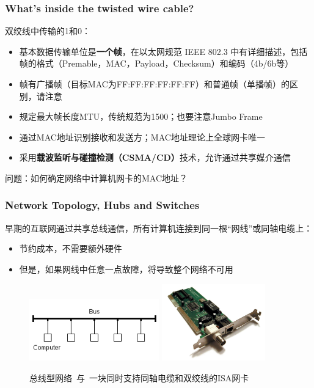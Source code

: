 \documentclass[11pt]{beamer}
\begin{document}
\begin{frame}
\frametitle{What's inside the twisted wire cable?}
双绞线中传输的1和0：
\begin{itemize}
\item 基本数据传输单位是\textbf{一个帧}，在以太网规范 IEEE 802.3 中有详细描述，包括帧的格式（Premable，MAC，Payload，Checksum）和编码（4b/6b等）
\item 帧有广播帧（目标MAC为FF:FF:FF:FF:FF:FF）和普通帧（单播帧）的区别，请注意
\item 规定最大帧长度MTU，传统规范为1500；也要注意Jumbo Frame
\item 通过MAC地址识别接收和发送方；MAC地址理论上全球网卡唯一
\item 采用\textbf{载波监听与碰撞检测（CSMA/CD）}技术，允许通过共享媒介通信
\end{itemize}
\centering 问题：如何确定网络中计算机网卡的MAC地址？
\end{frame}

\begin{frame}
\frametitle{Network Topology, Hubs and Switches}
早期的互联网通过共享总线通信，所有计算机连接到同一根“网线”或同轴电缆上：
\begin{itemize}
\item 节约成本，不需要额外硬件
\item 但是，如果网线中任意一点故障，将导致整个网络不可用
\end{itemize}
\begin{figure}
\includegraphics[width=0.5\textwidth]{Bustopologie.png}
\includegraphics[width=0.4\textwidth]{1024px-Network_card.jpg}
\caption{总线型网络\ 与\ 一块同时支持同轴电缆和双绞线的ISA网卡}
\end{figure}
\end{frame}
\end{document}
